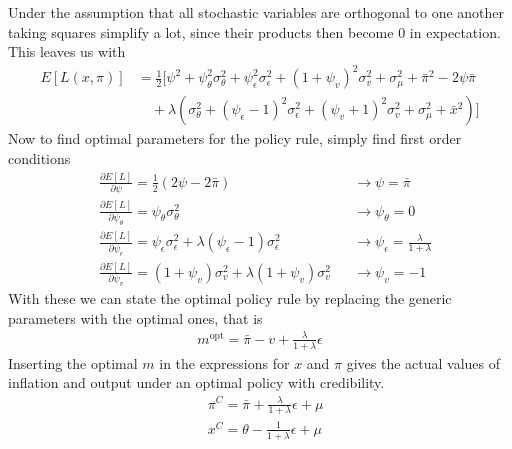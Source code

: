 \documentclass[12pt, a4paper]{article}
\begin{document}
\begin{spacing}{1.213}
Under the assumption that all stochastic variables are orthogonal to one another taking squares simplify a lot, since their products then become 0 in expectation. This leaves us with
\begin{align*}
E[L(x, \pi)] &= \frac{1}{2} [ \psi^2 + \psi_{\theta}^2 \sigma^2_{\theta} + \psi_{\epsilon}^2 \sigma^2_{\epsilon} + (1 + \psi_v)^2 \sigma^2_v + \sigma^2_{\mu} + \bar{\pi}^2 - 2\psi \bar{\pi}
\\
& \quad + \lambda(\sigma^2_{\theta} + (\psi_{\epsilon} -1)^2 \sigma^2_{\epsilon} + (\psi_v +1 )^2\sigma^2_v + \sigma^2_{\mu} + \bar{x}^2)  ]
\end{align*}
Now to find optimal parameters for the policy rule, simply find first order conditions
\begin{align*}
&\frac{\partial E[L]}{\partial \psi} = \frac{1}{2} (2\psi - 2 \bar{\pi}) &&\rightarrow \psi = \bar{\pi} \\
& \frac{\partial E[L]}{\partial \psi_{\theta}} = \psi_{\theta}\sigma^2_{\theta} && \rightarrow \psi_{\theta} = 0 \\
& \frac{\partial E[L]}{\partial \psi_{\epsilon}} = \psi_{\epsilon}\sigma^2_{\epsilon} + \lambda(\psi_{\epsilon}-1)\sigma^2_{\epsilon} && \rightarrow \psi_{\epsilon} = \frac{\lambda}{1+ \lambda} \\
& \frac{\partial E[L]}{\partial \psi_{v}} = (1+\psi_v )\sigma^2_v + \lambda(1+ \psi_v)\sigma^2_v && \rightarrow \psi_v = -1
\end{align*}
With these we can state the optimal policy rule by replacing the generic parameters with the optimal ones, that is
\begin{align*}
m^{\text{opt}} = \bar{\pi} - v + \frac{\lambda}{1+ \lambda} \epsilon
\end{align*}
Inserting the optimal $m$ in the expressions for $x$ and $\pi$ gives the actual values of inflation and output under an optimal policy with credibility.
\begin{align*}
&\pi^C = \bar{\pi} + \frac{\lambda}{1+\lambda} \epsilon + \mu \\
& x^C = \theta - \frac{1}{1+ \lambda}\epsilon + \mu
\end{align*}


\end{spacing}
\end{document}
